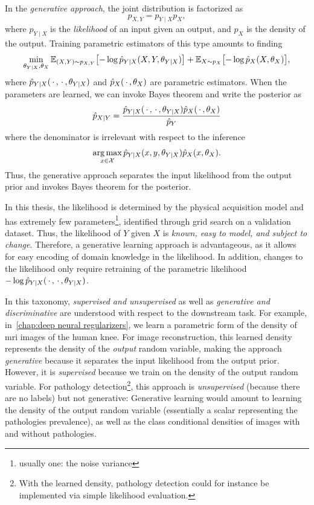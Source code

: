 In the \emph{generative approach}, the joint distribution is factorized as
\begin{equation}
	p_{X, Y} = p_{Y \mid X} p_X,
\end{equation}
where \( p_{Y \mid X} \) is the \emph{likelihood} of an input given an output, and \( p_X \) is the density of the output.
Training parametric estimators of this type amounts to finding
\begin{equation}
	\min_{\theta_{Y \mid X}, \theta_X} \mathbb{E}_{(X, Y) \sim p_{X, Y}}\bigl[ -\log \hat{p}_{Y\mid X}(X, Y, \theta_{Y\mid X}) \bigr] + \mathbb{E}_{X \sim p_X} \bigl[ -\log \hat{p}_X(X, \theta_X) \bigr],
\end{equation}
where \( \hat{p}_{Y \mid X}(\,\cdot\,, \,\cdot\,, \theta_{Y\mid X}) \) and \( \hat{p}_X(\,\cdot\,, \theta_X) \) are parametric estimators.
When the parameters are learned, we can invoke Bayes theorem and write the posterior as
\begin{equation}
	\hat{p}_{X \mid Y} = \frac{\hat{p}_{Y \mid X}(\,\cdot\,, \,\cdot\,, \theta_{Y \mid X})\hat{p}_X(\,\cdot\,, \theta_X)}{\hat{p}_Y}
\end{equation}
where the denominator is irrelevant with respect to the inference
\begin{equation}
	\operatorname*{arg\,max}_{x \in \mathcal{X}} \hat{p}_{Y\mid X}(x, y, \theta_{Y \mid X}) \hat{p}_X(x, \theta_X).
\end{equation}
Thus, the generative approach separates the input likelihood from the output prior and invokes Bayes theorem for the posterior.

In this thesis, the likelihood is determined by the physical acquisition model and has extremely few parameters\footnote{usually one: the noise variance}, identified through grid search on a validation dataset.
Thus, the likelihood of \( Y \) given \( X \) is \emph{known, easy to model, and subject to change}.
Therefore, a generative learning approach is advantageous, as it allows for easy encoding of domain knowledge in the likelihood.
In addition, changes to the likelihood only require retraining of the parametric likelihood \( -\log \hat{p}_{Y \mid X}(\,\cdot\,, \,\cdot\,, \theta_{Y \mid X}) \).

In this taxonomy, \emph{supervised and unsupervised} as well as \emph{generative and discriminative} are understood with respect to the downstream task.
For example, in~\cref{chap:deep neural regularizers}, we learn a parametric form of the density of \gls{mri} images of the human knee.
For image reconstruction, this learned density represents the density of the \emph{output} random variable, making the approach \emph{generative} because it separates the input likelihood from the output prior.
However, it is \emph{supervised} because we train on the density of the output random variable.
For pathology detection\footnote{%
	With the learned density, pathology detection could for instance be implemented via simple likelihood evaluation.
}, this approach is \emph{unsupervised} (because there are no labels) but not generative:
Generative learning would amount to learning the density of the output random variable (essentially a scalar representing the pathologies prevalence), as well as the class conditional densities of images with and without pathologies.

